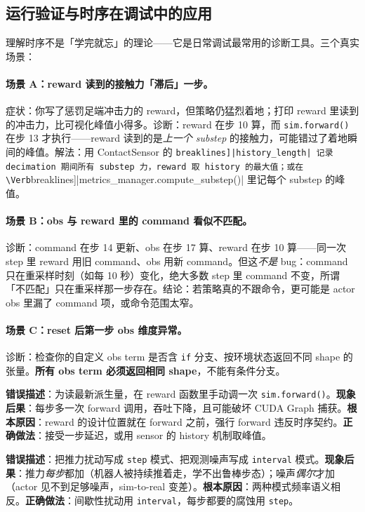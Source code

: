 \subsection{运行验证与时序在调试中的应用}

理解时序不是「学完就忘」的理论——它是日常调试最常用的诊断工具。三个真实场景：

\paragraph{场景 A：reward 读到的接触力「滞后」一步。}症状：你写了惩罚足端冲击力的 reward，但策略仍猛烈着地；打印 reward 里读到的冲击力，比可视化峰值小得多。诊断：reward 在步 10 算，而 \verb|sim.forward()| 在步 13 才执行——reward 读到的是\emph{上一个 substep} 的接触力，可能错过了着地瞬间的峰值。解法：用 ContactSensor 的 \Verb[breaklines]|history_length| 记录 decimation 期间所有 substep 力，reward 取 history 的最大值；或在 \Verb[breaklines]|metrics_manager.compute_substep()| 里记每个 substep 的峰值。

\paragraph{场景 B：obs 与 reward 里的 command 看似不匹配。}诊断：command 在步 14 更新、obs 在步 17 算、reward 在步 10 算——同一次 step 里 reward 用旧 command、obs 用新 command。但这\emph{不是} bug：command 只在重采样时刻（如每 10 秒）变化，绝大多数 step 里 command 不变，所谓「不匹配」只在重采样那一步存在。结论：若策略真的不跟命令，更可能是 actor obs 里漏了 command 项，或命令范围太窄。

\paragraph{场景 C：reset 后第一步 obs 维度异常。}诊断：检查你的自定义 obs term 是否含 \verb|if| 分支、按环境状态返回不同 shape 的张量。\textbf{所有 obs term 必须返回相同 shape}，不能有条件分支。

\begin{pitfall}
\textbf{错误描述}：为读最新派生量，在 reward 函数里手动调一次 \verb|sim.forward()|。\textbf{现象后果}：每步多一次 forward 调用，吞吐下降，且可能破坏 CUDA Graph 捕获。\textbf{根本原因}：reward 的设计位置就在 forward 之前，强行 forward 违反时序契约。\textbf{正确做法}：接受一步延迟，或用 sensor 的 history 机制取峰值。
\end{pitfall}

\begin{pitfall}
\textbf{错误描述}：把推力扰动写成 \verb|step| 模式、把观测噪声写成 \verb|interval| 模式。\textbf{现象后果}：推力\emph{每步}都加（机器人被持续推着走，学不出鲁棒步态）；噪声\emph{偶尔}才加（actor 见不到足够噪声，sim-to-real 变差）。\textbf{根本原因}：两种模式频率语义相反。\textbf{正确做法}：间歇性扰动用 \verb|interval|，每步都要的腐蚀用 \verb|step|。
\end{pitfall}

